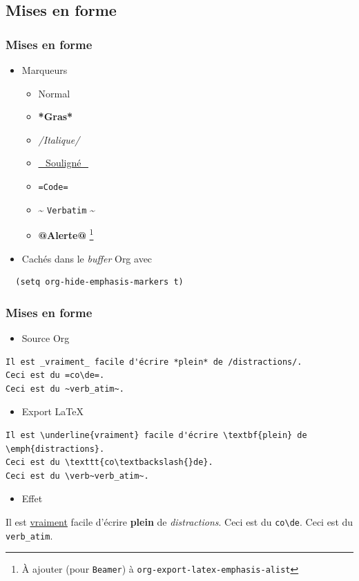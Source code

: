 \documentclass[presentation,t,hideothersubsections]{beamer}
\providecommand{\alert}[1]{\textbf{#1}}
\begin{document}
\subsection{Mises en forme}
\label{sec-2-5}
\begin{frame}[fragile]
\frametitle{Mises en forme}
\label{sec-2-5-1}


\begin{itemize}
\item Marqueurs
\begin{itemize}
\item Normal
\item \textbf{*Gras*}
\item \emph{/Italique/}
\item \underline{\_Souligné\_}
\item \texttt{=Code=}
\item \textasciitilde{} \verb~Verbatim~ \textasciitilde{}
\item \alert{@Alerte@} \footnote{À ajouter (pour \verb~Beamer~) à \texttt{org-export-latex-emphasis-alist}
 }
\end{itemize}
\item Cachés dans le \emph{buffer} Org avec
\end{itemize}


\lstset{language=TeX}
\begin{lstlisting}
  (setq org-hide-emphasis-markers t)
\end{lstlisting}
\end{frame}
\begin{frame}[fragile]
\frametitle{Mises en forme}
\label{sec-2-5-2}


\begin{itemize}
\item Source Org
\end{itemize}


\lstset{language=org}
\begin{lstlisting}
Il est _vraiment_ facile d'écrire *plein* de /distractions/.
Ceci est du =co\de=.
Ceci est du ~verb_atim~.
\end{lstlisting}

\begin{itemize}
\item Export \LaTeX{}
\end{itemize}


\lstset{language=TeX}
\begin{lstlisting}
Il est \underline{vraiment} facile d'écrire \textbf{plein} de
\emph{distractions}.
Ceci est du \texttt{co\textbackslash{}de}.
Ceci est du \verb~verb_atim~.
\end{lstlisting}

\begin{itemize}
\item Effet
\end{itemize}

Il est \underline{vraiment} facile d'écrire \textbf{plein} de \emph{distractions}.
Ceci est du \texttt{co\textbackslash{}de}.
Ceci est du \verb~verb_atim~.
\end{frame}
\end{document}
